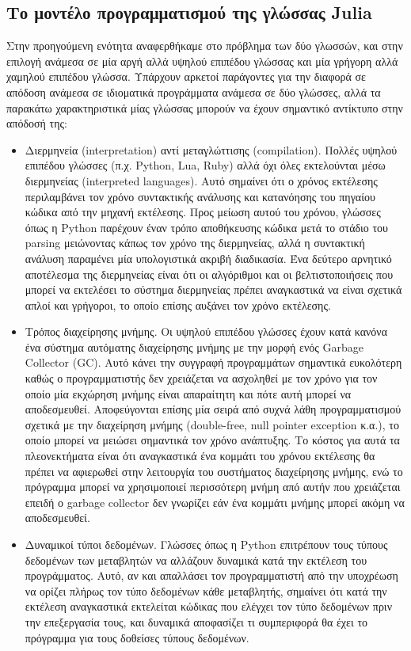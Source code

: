 \subsection{Το μοντέλο προγραμματισμού της γλώσσας Julia}

Στην προηγούμενη ενότητα αναφερθήκαμε στο πρόβλημα των δύο γλωσσών, και στην επιλογή ανάμεσα σε μία αργή αλλά υψηλού επιπέδου γλώσσας και μία γρήγορη αλλά χαμηλού επιπέδου γλώσσα.
Υπάρχουν αρκετοί παράγοντες για την διαφορά σε απόδοση ανάμεσα σε ιδιοματικά προγράμματα ανάμεσα σε δύο γλώσσες, αλλά τα παρακάτω χαρακτηριστικά μίας γλώσσας μπορούν να έχουν σημαντικό αντίκτυπο στην απόδοσή της:

\begin{itemize}
    \item Διερμηνεία (interpretation) αντί μεταγλώττισης (compilation).
        Πολλές υψηλού επιπέδου γλώσσες (π.χ. Python, Lua, Ruby) αλλά όχι όλες εκτελούνται μέσω διερμηνείας (interpreted languages).
        Αυτό σημαίνει ότι ο χρόνος εκτέλεσης περιλαμβάνει τον χρόνο συντακτικής ανάλυσης και κατανόησης του πηγαίου κώδικα από την μηχανή εκτέλεσης.
        Προς μείωση αυτού του χρόνου, γλώσσες όπως η Python παρέχουν έναν τρόπο αποθήκευσης κώδικα μετά το στάδιο του parsing μειώνοντας κάπως τον χρόνο της διερμηνείας, αλλά η συντακτική ανάλυση παραμένει μία υπολογιστικά ακριβή διαδικασία.
        Ένα δεύτερο αρνητικό αποτέλεσμα της διερμηνείας είναι ότι οι αλγόριθμοι και οι βελτιστοποιήσεις που μπορεί να εκτελέσει το σύστημα διερμηνείας πρέπει αναγκαστικά να είναι σχετικά απλοί και γρήγοροι, το οποίο επίσης αυξάνει τον χρόνο εκτέλεσης.
    \item Τρόπος διαχείρησης μνήμης. Οι υψηλού επιπέδου γλώσσες έχουν κατά κανόνα ένα σύστημα αυτόματης διαχείρησης μνήμης με την μορφή ενός Garbage Collector (GC).
        Αυτό κάνει την συγγραφή προγραμμάτων σημαντικά ευκολότερη καθώς ο προγραμματιστής δεν χρειάζεται να ασχοληθεί με τον χρόνο για τον οποίο μία εκχώρηση μνήμης είναι απαραίτητη και πότε αυτή μπορεί να αποδεσμευθεί.
        Αποφεύγονται επίσης μία σειρά από συχνά λάθη προγραμματισμού σχετικά με την διαχείρηση μνήμης (double-free, null pointer exception κ.α.), το οποίο μπορεί να μειώσει σημαντικά τον χρόνο ανάπτυξης.
        Το κόστος για αυτά τα πλεονεκτήματα είναι ότι αναγκαστικά ένα κομμάτι του χρόνου εκτέλεσης θα πρέπει να αφιερωθεί στην λειτουργία του συστήματος διαχείρησης μνήμης, ενώ το πρόγραμμα μπορεί να χρησιμοποιεί περισσότερη μνήμη από αυτήν που χρειάζεται επειδή ο garbage collector δεν γνωρίζει εάν ένα κομμάτι μνήμης μπορεί ακόμη να αποδεσμευθεί.
    \item Δυναμικοί τύποι δεδομένων.
        Γλώσσες όπως η Python επιτρέπουν τους τύπους δεδομένων των μεταβλητών να αλλάζουν δυναμικά κατά την εκτέλεση του προγράμματος.
        Αυτό, αν και απαλλάσει τον προγραμματιστή από την υποχρέωση να ορίζει πλήρως τον τύπο δεδομένων κάθε μεταβλητής, σημαίνει ότι κατά την εκτέλεση αναγκαστικά εκτελείται κώδικας που ελέγχει τον τύπο δεδομένων πριν την επεξεργασία τους, και δυναμικά αποφασίζει τι συμπεριφορά θα έχει το πρόγραμμα για τους δοθείσες τύπους δεδομένων.
\end{itemize}

